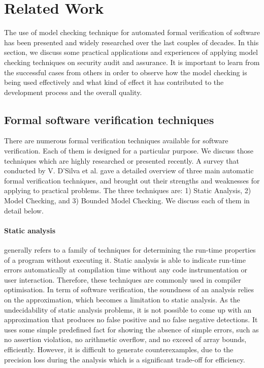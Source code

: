 
\section{Related Work}
The use of model checking technique for automated formal verification of software has been presented and widely researched over the last couples of decades. In this section, we discuss some practical applications and experiences of applying model checking techniques on security audit and assurance. It is important to learn from the successful cases from others in order to observe how the model checking is being used effectively and what kind of effect it has contributed to the development process and the overall quality.

\subsection{Formal software verification techniques}
There are numerous formal verification techniques available for software verification. Each of them is designed for a particular purpose. We discuss those techniques which are highly researched or presented recently.
A survey that conducted by V. D'Silva et al. \cite{4544862} gave a detailed overview of three main automatic formal verification techniques, and brought out their strengths and weaknesses for applying to practical problems. The three techniques are: 1) Static Analysis, 2) Model Checking, and 3) Bounded Model Checking. We discuss each of them in detail below.


\paragraph{Static analysis} generally refers to a family of techniques for determining the run-time properties of a program without executing it. Static analysis is able to indicate run-time errors automatically at compilation time without any code instrumentation or user interaction. Therefore, these techniques are commonly used in compiler optimisation. In term of software verification, the soundness of an analysis relies on the approximation, which becomes a limitation to static analysis. As the undecidability of static analysis problems, it is not possible to come up with an approximation that produces no false positive and no false negative detections. It uses some simple predefined fact for showing the absence of simple errors, such as no assertion violation, no arithmetic overflow, and no exceed of array bounds, efficiently. However, it is difficult to generate counterexamples, due to the precision loss during the analysis which is a significant trade-off for efficiency.

